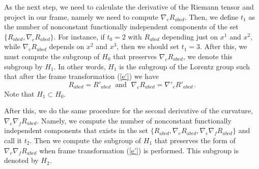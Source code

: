 \documentclass[twocolumn,prd,aps,showpacs,showkeys,amsmath,amssymb]{revtex4-1}
\begin{document}
As the next step, we need to calculate the derivative of the Riemann tensor and project in our frame, namely we need to compute $\nabla_eR_{abcd}$.  Then,
we define $t_1$ as the number of nonconstant functionally independent components of the set $\{R_{abcd},\nabla_eR_{abcd}\}$. For instance, if $t_0=2$ with $R_{abcd}$ depending just on $x^1$ and $x^2$, while $\nabla_eR_{abcd}$ depends on $x^2$ and $x^3$, then we should set $t_1=3$. After this, we must compute the subgroup of $H_0$ that preserves $\nabla_eR_{abcd}$, we denote this subgroup by $H_1$. In other words, $H_1$ is the subgroup of the Lorentz group such that after the frame transformation (\ref{e'}) we have
\begin{equation*}
  R_{abcd} =   R'_{abcd} \; \textrm{ and } \; \nabla_eR_{abcd} = \nabla'_eR'_{abcd} \,.
\end{equation*}
Note that $H_1\subset H_0$.


After this, we do the same procedure for the second derivative of the curvature, $\nabla_e\nabla_f R_{abcd}$. Namely, we compute the number of nonconstant functionally independent components that exists in the set $\{R_{abcd},\nabla_eR_{abcd},\nabla_e\nabla_f R_{abcd}\}$ and call it $t_2$. Then we compute the subgroup of $H_1$ that preserves the form of $\nabla_e\nabla_f R_{abcd}$ when frame transformation (\ref{e'}) is performed. This subgroup is denoted by $H_2$.
\end{document}
